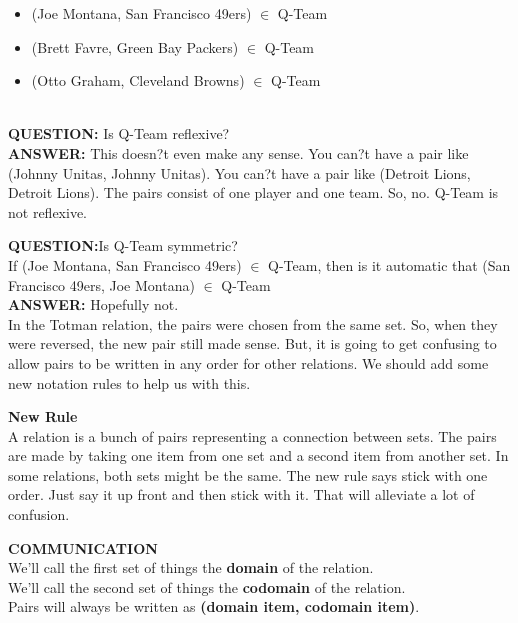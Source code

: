 \documentclass{ximera}
\begin{document}
\begin{example}
\begin{itemize}
 \item (Joe Montana, San Francisco 49ers) $\in$ Q-Team
 \item (Brett Favre, Green Bay Packers) $\in$ Q-Team
 \item (Otto Graham, Cleveland Browns) $\in$ Q-Team
\end{itemize}
\end{example}

\quad \\



\textbf{QUESTION:} Is Q-Team reflexive? \\
\textbf{ANSWER:} This doesn?t even make {\color{red}any sense}.  You can?t have a pair like (Johnny Unitas, Johnny Unitas). You can?t have a pair like (Detroit Lions, Detroit Lions).  The pairs consist of one player and one team. So, no. Q-Team is not reflexive.


\textbf{QUESTION:}Is Q-Team symmetric?\\
If (Joe Montana, San Francisco 49ers) $\in$ Q-Team, then is it automatic that (San Francisco 49ers, Joe Montana) $\in$ Q-Team\\
\textbf{ANSWER:} Hopefully not. \\
In the Totman relation, the pairs were chosen from the same set.  So, when they were reversed, the new pair still made sense.  But, it is going to get confusing to allow pairs to be written in any order for other relations. We should add some new notation rules to help us with this.


\textbf{New Rule} \\
A relation is a bunch of pairs representing a connection between sets.  The pairs are made by taking one item from one set and a second item from another set. In some relations, both sets might be the same.  The new rule says stick with one order.  Just say it up front and then stick with it.  That will alleviate a lot of confusion.



\begin{remark} \textbf{COMMUNICATION} \\
We'll call the first set of things the \textbf{domain} of the relation. \\
We'll call the second set of things the \textbf{codomain} of the relation.  \\
Pairs will always be written as \textbf{(domain item, codomain item)}.
\end{remark}
\end{document}
